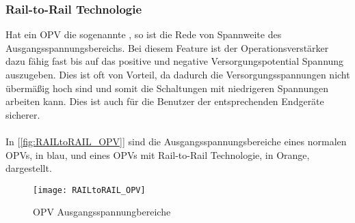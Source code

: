 \documentclass[titlepage,12pt,twoside]{article}
\begin{document}
\subsubsection{Rail-to-Rail Technologie}
Hat ein OPV die sogenannte , so ist die Rede von Spannweite des Ausgangsspannungsbereichs. Bei diesem Feature
ist der Operationsverstärker dazu fähig fast bis auf das positive und negative Versorgungspotential Spannung auszugeben. Dies ist oft 
von Vorteil, da dadurch die Versorgungsspannungen nicht übermäßig hoch sind und somit die Schaltungen mit niedrigeren Spannungen arbeiten
kann. Dies ist auch für die Benutzer der entsprechenden Endgeräte sicherer.\\
\\
In [\textcolor{blue}{\autoref{fig:RAILtoRAIL_OPV}}] sind die Ausgangsspannungsbereiche eines normalen OPVs, in blau, und eines OPVs mit Rail-to-Rail Technologie,
in Orange, dargestellt. \\
\begin{figure}[H]
	\begin{center}
		\scalebox{0.8}
		{\texttt{[image: RAILtoRAIL\_OPV]}}
		\caption{OPV Ausgangsspannungbereiche}
		\label{fig:RAILtoRAIL_OPV}
	\end{center}
\end{figure}
\end{document}
